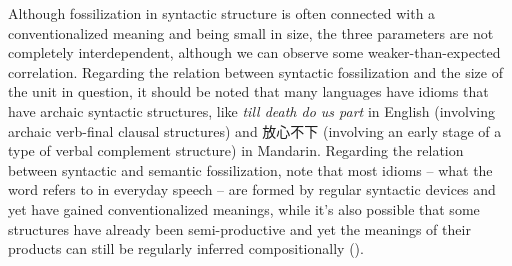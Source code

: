 \documentclass[UTF8, a4paper, oneside, scheme=plain, 12pt]{ctexrep}
\newcommand{\form}[1]{\emph{#1}}
\begin{document}
Although fossilization in syntactic structure 
is often connected with 
a conventionalized meaning and being small in size,
the three parameters are not completely interdependent, 
although we can observe some weaker-than-expected correlation.
Regarding the relation between syntactic fossilization 
and the size of the unit in question, 
it should be noted that many languages have 
idioms that have archaic syntactic structures, 
like \form{till death do us part} in English 
(involving archaic verb-final clausal structures)
and 放心不下 (involving an early stage of a type of verbal complement structure) 
in Mandarin.
Regarding the relation between syntactic and semantic fossilization, 
note that most idioms -- what the word refers to in everyday speech -- 
are formed by regular syntactic devices and yet have gained conventionalized meanings, 
while it's also possible that some structures have already been semi-productive
and yet the meanings of their products can still be 
regularly inferred compositionally
().
\end{document}
